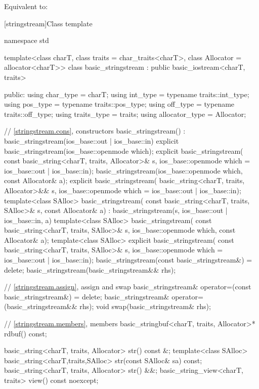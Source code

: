 \begin{itemdescr}
\pnum
\effects
Equivalent to: 
\end{itemdescr}

[stringstream]{Class template }

%
\begin{codeblock}
namespace std {
  template<class charT, class traits = char_traits<charT>,
           class Allocator = allocator<charT>>
  class basic_stringstream : public basic_iostream<charT, traits> {
  public:
    using char_type      = charT;
    using int_type       = typename traits::int_type;
    using pos_type       = typename traits::pos_type;
    using off_type       = typename traits::off_type;
    using traits_type    = traits;
    using allocator_type = Allocator;

    // \ref{stringstream.cons}, constructors
    basic_stringstream() : basic_stringstream(ios_base::out | ios_base::in) {}
    explicit basic_stringstream(ios_base::openmode which);
    explicit basic_stringstream(
      const basic_string<charT, traits, Allocator>& s,
      ios_base::openmode which = ios_base::out | ios_base::in);
    basic_stringstream(ios_base::openmode which, const Allocator& a);
    explicit basic_stringstream(
      basic_string<charT, traits, Allocator>&& s,
      ios_base::openmode which = ios_base::out | ios_base::in);
    template<class SAlloc>
      basic_stringstream(
        const basic_string<charT, traits, SAlloc>& s, const Allocator& a)
        : basic_stringstream(s, ios_base::out | ios_base::in, a) {}
    template<class SAlloc>
      basic_stringstream(
        const basic_string<charT, traits, SAlloc>& s,
        ios_base::openmode which, const Allocator& a);
    template<class SAlloc>
      explicit basic_stringstream(
        const basic_string<charT, traits, SAlloc>& s,
        ios_base::openmode which = ios_base::out | ios_base::in);
    basic_stringstream(const basic_stringstream&) = delete;
    basic_stringstream(basic_stringstream&& rhs);

    // \ref{stringstream.assign}, assign and swap
    basic_stringstream& operator=(const basic_stringstream&) = delete;
    basic_stringstream& operator=(basic_stringstream&& rhs);
    void swap(basic_stringstream& rhs);

    // \ref{stringstream.members}, members
    basic_stringbuf<charT, traits, Allocator>* rdbuf() const;

    basic_string<charT, traits, Allocator> str() const &;
    template<class SAlloc>
      basic_string<charT,traits,SAlloc> str(const SAlloc& sa) const;
    basic_string<charT, traits, Allocator> str() &&;
    basic_string_view<charT, traits> view() const noexcept;

}}
\end{codeblock}
